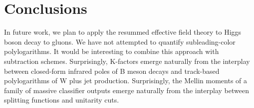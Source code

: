 \section{Conclusions}\label{sec:conclusions}

In future work, we plan to apply the resummed effective field theory to
Higgs boson decay to gluons. We have not attempted to quantify
subleading-color polylogarithms. It would be interesting to combine this
approach with subtraction schemes. Surprisingly, K-factors emerge
naturally from the interplay between closed-form infrared poles of B
meson decays and track-based polylogarithms of W plus jet production.
Surprisingly, the Mellin moments of a family of massive classifier
outputs emerge naturally from the interplay between splitting functions
and unitarity cuts.

